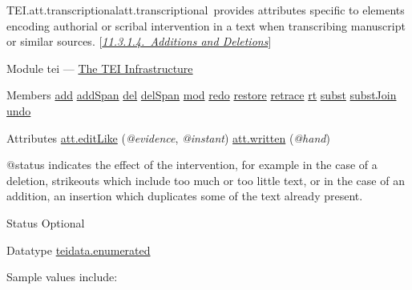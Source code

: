 \begin{reflist}
\item[]\begin{specHead}{TEI.att.transcriptional}{att.transcriptional} provides attributes specific to elements encoding authorial or scribal intervention in a text when transcribing manuscript or similar sources. [\textit{\hyperref[PHAD]{11.3.1.4.\ Additions and Deletions}}]\end{specHead} 
    \item[{Module}]
  tei — \hyperref[ST]{The TEI Infrastructure}
    \item[{Members}]
  \hyperref[TEI.add]{add} \hyperref[TEI.addSpan]{addSpan} \hyperref[TEI.del]{del} \hyperref[TEI.delSpan]{delSpan} \hyperref[TEI.mod]{mod} \hyperref[TEI.redo]{redo} \hyperref[TEI.restore]{restore} \hyperref[TEI.retrace]{retrace} \hyperref[TEI.rt]{rt} \hyperref[TEI.subst]{subst} \hyperref[TEI.substJoin]{substJoin} \hyperref[TEI.undo]{undo}
    \item[{Attributes}]
  \hyperref[TEI.att.editLike]{att.editLike} (\textit{@evidence}, \textit{@instant}) \hyperref[TEI.att.written]{att.written} (\textit{@hand}) \hfil\\[-10pt]\begin{sansreflist}
    \item[@status]
  indicates the effect of the intervention, for example in the case of a deletion, strikeouts which include too much or too little text, or in the case of an addition, an insertion which duplicates some of the text already present.
\begin{reflist}
    \item[{Status}]
  Optional
    \item[{Datatype}]
  \hyperref[TEI.teidata.enumerated]{teidata.enumerated}
    \item[{Sample values include:}]
  \begin{description}


\end{description}
\end{reflist}
\end{sansreflist}
\end{reflist}

